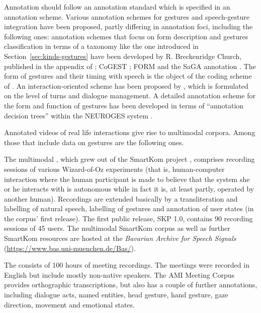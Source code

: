 \documentclass[output=paper]{langsci/langscibook}
\begin{document}
Annotation should follow an annotation standard which is specified in an annotation scheme.
%
Various annotation schemes for gestures and speech-gesture integration have been proposed, partly differing in annotation foci, including the following ones:
%
annotation schemes that focus on form description and gestures classification in terms of a taxonomy like the one introduced in Section~\ref{sec:kinds-gestures} have been developed by R. Breckenridge Church, published in the appendix of \citet{McNeill:1992}; CoGEST \citep{Gibbon:et:al:2003}; FORM \citep{Martell:Osborn:Friedman:Howard:2002} and the SaGA annotation \citep{Luecking:Bergmann:Hahn:Kopp:Rieser:2013}.
%
The form of gestures and their timing with speech is the object of the coding scheme of \citet{Kipp:Neff:Albrecht:2007}.
%
An interaction-oriented scheme has been proposed by \citet{Allwood:et:al:2007}, which is formulated on the level of turns and dialogue management.
%
A detailed annotation scheme for the form and function of gestures has been developed in terms of \enquote{annotation decision trees} within the NEUROGES system \citep{Lausberg:Sloetjes:2009}.


Annotated videos of real life interactions give rise to multimodal corpora. 
%
Among those that include data on gestures are the following ones.

The multimodal  \citep{Schiel:Steininger:Tuerk:2003}, which grew out of the SmartKom project \citep{Wahlster:2006}, comprises recording sessions of various Wizard-of-Oz experiments (that is, human-computer interaction where the human participant is made to believe that the system she or he interacts with is autonomous while in fact it is, at least partly, operated by another human).
%
Recordings are extended basically by a transliteration and labelling of natural speech, labelling of gestures and annotation of user states (in the corpus' first release). 
%
The first public release, SKP 1.0, contains 90 recording sessions of 45 users. 
%
The multimodal SmartKom corpus as well as further SmartKom resources are hosted at the \textit{Bavarian Archive for Speech Signals} (\url{https://www.bas.uni-muenchen.de/Bas/}).


The  \citep{Carletta:et:al:2006} consists of 100 hours of meeting recordings.
%
The meetings were recorded in English but include mostly non-native speakers. 
%
The AMI Meeting Corpus provides orthographic transcriptions, but also has a couple of further annotations, including dialogue acts, named entities, head gesture, hand gesture, gaze direction, movement and emotional states.
\end{document}
